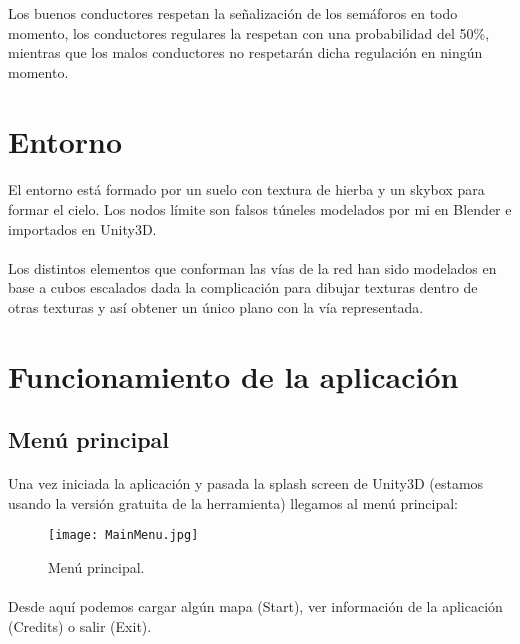 	Los buenos conductores respetan la señalización de los semáforos en todo momento, los conductores regulares la respetan con una probabilidad del 50\%, mientras que los malos conductores no respetarán dicha regulación en ningún momento.
	
\section{Entorno}

	\paragraph{}
	El entorno está formado por un suelo con textura de hierba y un skybox para formar el cielo. Los nodos límite son falsos túneles modelados por mi en Blender \cite{Blender_web} e importados en Unity3D.
	\paragraph{}
	Los distintos elementos que conforman las vías de la red han sido modelados en base a cubos escalados dada la complicación para dibujar texturas dentro de otras texturas y así obtener un único plano con la vía representada.

\section{Funcionamiento de la aplicación}
	
	\subsection{Menú principal}
	\paragraph{}
	Una vez iniciada la aplicación y pasada la splash screen de Unity3D (estamos usando la versión gratuita de la herramienta) llegamos al menú principal:
	
	\begin{figure}[H]
		\centering
			\texttt{[image: MainMenu.jpg]}
	\caption{Menú principal.}
	\label{fig:MainMenu}
	\end{figure}
	
	\paragraph{}
	Desde aquí podemos cargar algún mapa (Start), ver información de la aplicación (Credits) o salir (Exit).

